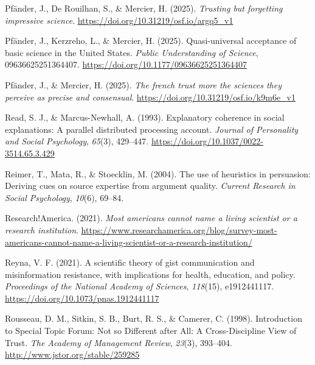\documentclass[
  jou,
  floatsintext,
  longtable,
  nolmodern,
  notxfonts,
  notimes,
  colorlinks=true,linkcolor=blue,citecolor=blue,urlcolor=blue]{apa7}
\newlength{\cslhangindent}
\newenvironment{CSLReferences}[2] %
 {\begin{list}{}{%
  \setlength{\itemindent}{0pt}
  \setlength{\leftmargin}{0pt}
  \setlength{\parsep}{0pt}
  \ifodd #1
   \setlength{\leftmargin}{\cslhangindent}
   \setlength{\itemindent}{-1\cslhangindent}
  \fi
  \setlength{\itemsep}{#2\baselineskip}}}
 {\end{list}}
\begin{document}
\begin{CSLReferences}{1}{0}
Pfänder, J., De Rouilhan, S., \& Mercier, H. (2025). \emph{Trusting but
forgetting impressive science}.
\url{https://doi.org/10.31219/osf.io/argq5_v1}

Pfänder, J., Kerzreho, L., \& Mercier, H. (2025). Quasi-universal
acceptance of basic science in the United States. \emph{Public
Understanding of Science}, 09636625251364407.
\url{https://doi.org/10.1177/09636625251364407}

Pfänder, J., \& Mercier, H. (2025). \emph{The french trust more the
sciences they perceive as precise and consensual}.
\url{https://doi.org/10.31219/osf.io/k9m6e_v1}

Read, S. J., \& Marcus-Newhall, A. (1993). Explanatory coherence in
social explanations: A parallel distributed processing account.
\emph{Journal of Personality and Social Psychology}, \emph{65}(3),
429--447. \url{https://doi.org/10.1037/0022-3514.65.3.429}

Reimer, T., Mata, R., \& Stoecklin, M. (2004). The use of heuristics in
persuasion: Deriving cues on source expertise from argument quality.
\emph{Current Research in Social Psychology}, \emph{10}(6), 69--84.

Research!America. (2021). \emph{Most americans cannot name a living
scientist or a research institution}.
\url{https://www.researchamerica.org/blog/survey-most-americans-cannot-name-a-living-scientist-or-a-research-institution/}

Reyna, V. F. (2021). A scientific theory of gist communication and
misinformation resistance, with implications for health, education, and
policy. \emph{Proceedings of the National Academy of Sciences},
\emph{118}(15), e1912441117.
\url{https://doi.org/10.1073/pnas.1912441117}

Rousseau, D. M., Sitkin, S. B., Burt, R. S., \& Camerer, C. (1998).
Introduction to Special Topic Forum: Not so Different after All: A
Cross-Discipline View of Trust. \emph{The Academy of Management Review},
\emph{23}(3), 393--404. \url{http://www.jstor.org/stable/259285}


\end{CSLReferences}
\end{document}
